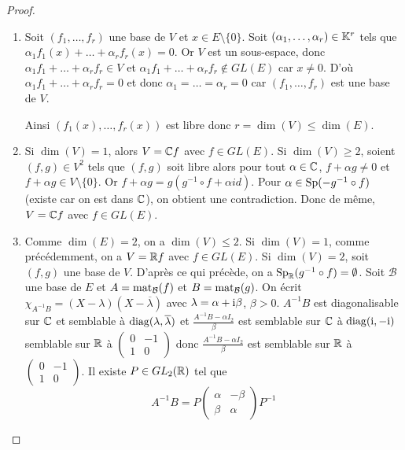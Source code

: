 \documentclass[12pt]{article}
\begin{document}
\begin{proof}
	\phantom{}
	\begin{enumerate}
		\item Soit $(f_{1},\dots,f_{r})$ une base de $V$ et $x\in E\setminus\lbrace0\rbrace$. Soit $(\alpha_{1},\dots,\alpha_{r})\in\mathbb{K}^{r}$ tels que $\alpha_{1}f_{1}(x)+\dots+\alpha_{r}f_{r}(x)=0$. Or $V$ est un sous-espace, donc $\alpha_{1}f_{1}+\dots+\alpha_{r}f_{r}\in V$ et $\alpha_{1}f_{1}+\dots+\alpha_{r}f_{r}\notin GL(E)$ car $x\neq0$. D'où $\alpha_{1}f_{1}+\dots+\alpha_{r}f_{r}=0$ et donc $\alpha_{1}=\dots=\alpha_{r}=0$ car $(f_{1},\dots,f_{r})$ est une base de $V$.
		
		Ainsi $(f_{1}(x),\dots,f_{r}(x))$ est libre donc $r=\dim(V)\leqslant\dim(E)$.

		\item Si $\dim(V)=1$, alors $V=\mathbb{C} f$ avec $f\in GL(E)$. Si $\dim(V)\geqslant2$, soient $(f,g)\in V^{2}$ tels que $(f,g)$ soit libre alors pour tout $\alpha\in\mathbb{C}$, $f+\alpha g\neq0$ et $f+\alpha g\in V\setminus\lbrace0\rbrace$. Or $f+\alpha g=g(g^{-1}\circ f+\alpha id)$. Pour $\alpha\in \operatorname{Sp}(-g^{-1}\circ f)$ (existe car on est dans $\mathbb{C}$), on obtient une contradiction. Donc de même, $V=\mathbb{C} f$ avec $f\in GL(E)$.
		
		\item Comme $\dim(E)=2$, on a $\dim(V)\leqslant2$. Si $\dim(V)=1$, comme précédemment, on a $V=\mathbb{R} f$ avec $f\in GL(E)$. Si $\dim(V)=2$, soit $(f,g)$ une base de $V$. D'après ce qui précède, on a $\operatorname{Sp}_{\mathbb{R}}(g^{-1}\circ f)=\emptyset$. Soit $\mathcal{B}$ une base de $E$ et $A=\operatorname{mat}_{\mathcal{B}}(f)$ et $B=\operatorname{mat}_{\mathcal{B}}(g)$. On écrit $\chi_{A^{-1}B}=(X-\lambda)(X-\overline{\lambda})$ avec $\lambda=\alpha+\mathrm{i} \beta$, $\beta>0$. $A^{-1}B$ est diagonalisable sur $\mathbb{C}$ et semblable à $\operatorname{diag}(\lambda,\overline{\lambda})$ et $\frac{A^{-1}B-\alpha I_{2}}{\beta}$ est semblable sur $\mathbb{C}$ à $\operatorname{diag}(\mathrm{i},-\mathrm{i})$ semblable sur $\mathbb{R}$ à $\begin{pmatrix}
			0&-1\\1&0
		\end{pmatrix}$ donc $\frac{A^{-1}B-\alpha I_{2}}{\beta}$ est semblable sur $\mathbb{R}$ à $\begin{pmatrix}
			0&-1\\1&0
		\end{pmatrix}$. Il existe $P\in GL_{2}(\mathbb{R})$ tel que 
		\begin{equation}
			A^{-1}B=P\begin{pmatrix}
				\alpha&-\beta\\\beta&\alpha
			\end{pmatrix}P^{-1}
		\end{equation}


\end{enumerate}
\end{proof}
\end{document}
